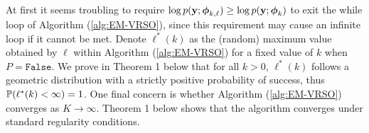 At first it seems troubling to require $\log p(\mathbf{y};\boldsymbol{\phi}_{k,\ell}) \geq \log p(\mathbf{y};\boldsymbol{\phi}_{k})$ to exit the while loop of Algorithm (\ref{alg:EM-VRSO}), since this requirement may cause an infinite loop if it cannot be met. %
Denote $\ell^*(k)$ as the (random) maximum value obtained by $\ell$ within Algorithm (\ref{alg:EM-VRSO}) for a fixed value of $k$ when $P = \texttt{False}$. We prove in Theorem 1 below that for all $k > 0$, $\ell^*(k)$ follows a geometric distribution with a strictly positive probability of success, thus $\mathbb{P}(\ell^*(k) < \infty) = 1$. %
%
One final concern is whether Algorithm (\ref{alg:EM-VRSO}) converges as $K \to \infty$. %
Theorem 1 below shows that the algorithm converges under standard regularity conditions. %

    
